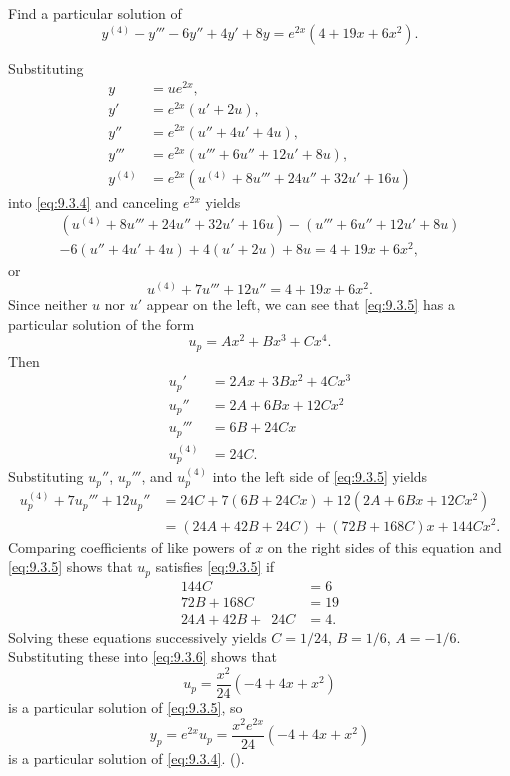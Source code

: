 \begin{example}\label{example:9.3.2}
Find a particular solution of
\begin{equation} \label{eq:9.3.4}
y^{(4)}-y'''-6y''+4y'+8y=e^{2x}(4+19x+6x^2).
\end{equation}
\end{example}

\begin{solution}
Substituting
\begin{align*}
y&=ue^{2x},\\
y'&=e^{2x}(u'+2u),\\
y''&=e^{2x}(u''+4u'+4u),\\
y'''&=e^{2x}(u'''+6u''+12u'+8u),\\
y^{(4)}&=e^{2x}(u^{(4)}+8u'''+24u''+32u'+16u)
\end{align*}
into \eqref{eq:9.3.4} and canceling $e^{2x}$ yields
\begin{multline*}
(u^{(4)}+8u'''+24u''+32u'+16u)-(u'''+6u''+12u'+8u)\\
-6(u''+4u'+4u)+4(u'+2u)+8u=4+19x+6x^2,
\end{multline*}
or
\begin{equation} \label{eq:9.3.5}
u^{(4)}+7u'''+12u''=4+19x+6x^2.
\end{equation}
Since neither $u$ nor $u'$ appear on the left, we can see that
\eqref{eq:9.3.5} has a particular solution of the form
\begin{equation} \label{eq:9.3.6}
u_p=Ax^2+Bx^3+Cx^4.
\end{equation}
Then
\begin{align*}
u_p'&=2Ax+3Bx^2+4Cx^3\\
u_p''&=2A+6Bx+12Cx^2\\
u_p'''&=6B+24Cx\\
u_p^{(4)}&=24C.
\end{align*}
Substituting $u_p''$, $u_p'''$, and $u_p^{(4)}$  into the left side of
\eqref{eq:9.3.5} yields
\begin{align*}
u_p^{(4)}+7u_p'''+12u_p''
&=24C+7(6B+24Cx)+12(2A+6Bx+12Cx^2)\\
&=(24A+42B+24C)+(72B+168C)x+144Cx^2.
\end{align*}
Comparing coefficients of like powers of $x$ on the right sides of
this equation and \eqref{eq:9.3.5} shows that $u_p$ satisfies \eqref{eq:9.3.5}
if
\begin{align*}
144C&=6\\
72B+168C&=19\\
24A+42B+\phantom{1}24C&=4.
\end{align*}
Solving these equations successively yields $C=1/24$, $B=1/6$, $A=-1/6$.
Substituting these into \eqref{eq:9.3.6} shows that
\[
u_p=\frac{x^2}{24}(-4+4x+x^2)
\]
is a particular solution of  \eqref{eq:9.3.5}, so
\[
y_p=e^{2x}u_p=\frac{x^2e^{2x}}{24}(-4+4x+x^2)
\]
is a particular solution of  \eqref{eq:9.3.4}.
().
\end{solution}

